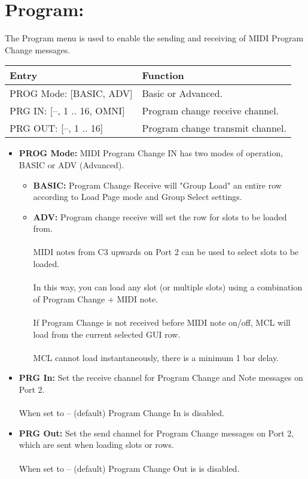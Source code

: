 \section{Program:}
The Program menu is used to enable the sending and receiving of MIDI Program Change messages.
\\
\begin{tabular}{|l|l|}
\hline
\rowcolor[HTML]{C0C0C0} 
Entry                                  & Function                                                                       \\ \hline
PROG Mode: {[}BASIC, ADV{]}                & Basic or Advanced. 
\\ \hline
PRG IN: {[}--, 1 .. 16, OMNI{]}            & Program change receive channel.                                            \\ \hline
PRG OUT: {[}--, 1 .. 16{]}          & Program change transmit channel.                                          \\ \hline
\end{tabular}
\begin{itemize}
    \item{\textbf{PROG Mode:} MIDI Program Change IN has two modes of operation, BASIC or ADV (Advanced).
\begin{itemize}
    \item{ \textbf{BASIC:} Program Change Receive will "Group Load" an entire row according to Load Page mode and Group Select settings. }
    \item{  \textbf{ADV:} Program change receive will set the row for slots to be loaded from.\\\\ MIDI notes from C3 upwards on Port 2 can be used to select slots to be loaded.\\\\  In this way, you can load any slot (or multiple slots) using a combination of Program Change + MIDI note. \\\\
 If Program Change is not received before MIDI note on/off, MCL will load from the current selected GUI row.\\\\ 
 MCL cannot load instantaneously, there is a minimum 1 bar delay.}
\end{itemize}}
\item{\textbf{PRG In:}
Set the receive channel for Program Change and Note messages on Port 2.\\\\
When set to -- (default) Program Change In is disabled.}
\item{\textbf{PRG Out:}
Set the send channel for Program Change messages on Port 2, which are sent when loading slots or rows.\\\\
When set to -- (default) Program Change Out is is disabled.}
\end{itemize}

